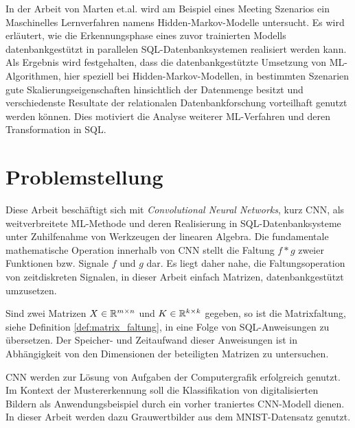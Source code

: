 In der Arbeit von Marten et.al.\cite{marten2017machine} wird am Beispiel eines Meeting Szenarios ein Maschinelles Lernverfahren namens Hidden-Markov-Modelle untersucht. Es wird erläutert, wie die Erkennungsphase eines zuvor trainierten Modells datenbankgestützt in parallelen SQL-Datenbanksystemen realisiert werden kann.   
Als Ergebnis wird festgehalten, dass die datenbankgestützte Umsetzung von ML-Algorithmen, hier speziell bei Hidden-Markov-Modellen, in bestimmten Szenarien gute Skalierungseigenschaften hinsichtlich der Datenmenge besitzt und verschiedenste Resultate der relationalen Datenbankforschung vorteilhaft genutzt werden können. Dies motiviert die Analyse weiterer ML-Verfahren und deren Transformation in SQL. 

\section*{Problemstellung}
\label{abs:problemstellung}
Diese Arbeit beschäftigt sich mit \textit{Convolutional Neural Networks}, kurz CNN, als weitverbreitete ML-Methode und deren Realisierung in SQL-Datenbanksysteme unter Zuhilfenahme von Werkzeugen der linearen Algebra. Die fundamentale mathematische Operation innerhalb von CNN stellt die Faltung $ f \ast g$ zweier Funktionen bzw. Signale $f$ und $g$ dar. 
Es liegt daher nahe, die Faltungsoperation von zeitdiskreten Signalen, in dieser Arbeit einfach Matrizen, datenbankgestützt umzusetzen.

\begin{problem}
    \label{prob:conv_in_sql}
Sind zwei Matrizen $X \in \mathbb{R}^{m \times n}$ und $K \in \mathbb{R}^{k \times k}$ gegeben, so ist die Matrixfaltung, siehe Definition \ref{def:matrix_faltung}, in eine Folge von SQL-Anweisungen zu übersetzen. Der Speicher- und Zeitaufwand dieser Anweisungen ist in Abhängigkeit von den Dimensionen der beteiligten Matrizen zu untersuchen.   
\end{problem}

CNN werden zur Lösung von Aufgaben der Computergrafik\cite{DBLP:conf/nips/KrizhevskySH12, DBLP:journals/pieee/LeCunBBH98,DBLP:conf/cvpr/CiresanMS12} erfolgreich genutzt.
Im Kontext der Mustererkennung soll die Klassifikation von digitalisierten Bildern als Anwendungsbeispiel durch ein vorher traniertes CNN-Modell dienen. In dieser Arbeit werden dazu Grauwertbilder aus dem MNIST-Datensatz\cite{lecun1998gradient} genutzt. 


